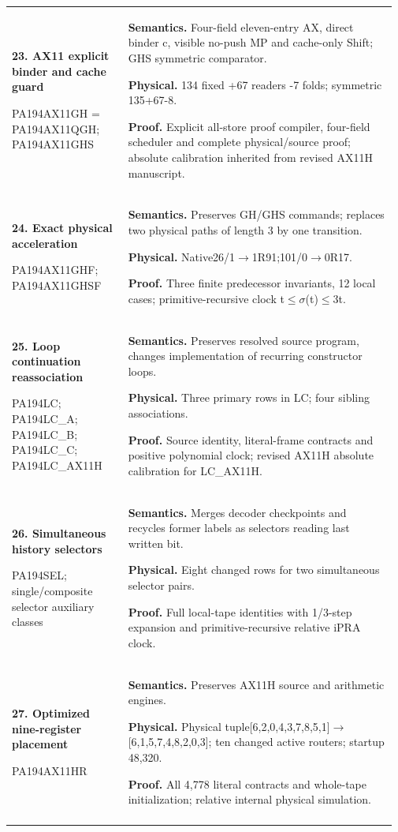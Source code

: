 \begin{longtable}{@{}>{\raggedright\arraybackslash}p{0.295\linewidth}>{\raggedright\arraybackslash}p{0.675\linewidth}@{}}
\textbf{23. AX11 explicit binder and cache guard}\par PA194AX11GH = PA194AX11QGH; PA194AX11GHS & \textbf{Semantics.} Four-field eleven-entry AX, direct binder c, visible no-push MP and cache-only Shift; GHS symmetric comparator.\par\textbf{Physical.} 134 fixed +67 readers -7 folds; symmetric 135+67-8.\par\textbf{Proof.} Explicit all-store proof compiler, four-field scheduler and complete physical/source proof; absolute calibration inherited from revised AX11H manuscript.\\\addlinespace[6pt]
\textbf{24. Exact physical acceleration}\par PA194AX11GHF; PA194AX11GHSF & \textbf{Semantics.} Preserves GH/GHS commands; replaces two physical paths of length 3 by one transition.\par\textbf{Physical.} Native26/1\(\to\)1R91;101/0\(\to\)0R17.\par\textbf{Proof.} Three finite predecessor invariants, 12 local cases; primitive-recursive clock t\(\le\)\(\sigma\)(t)\(\le\)3t.\\\addlinespace[6pt]
\textbf{25. Loop continuation reassociation}\par PA194LC; PA194LC\_\allowbreak{}A; PA194LC\_\allowbreak{}B; PA194LC\_\allowbreak{}C; PA194LC\_\allowbreak{}AX11H & \textbf{Semantics.} Preserves resolved source program, changes implementation of recurring constructor loops.\par\textbf{Physical.} Three primary rows in LC; four sibling associations.\par\textbf{Proof.} Source identity, literal-frame contracts and positive polynomial clock; revised AX11H absolute calibration for LC\_\allowbreak{}AX11H.\\\addlinespace[6pt]
\textbf{26. Simultaneous history selectors}\par PA194SEL; single/composite selector auxiliary classes & \textbf{Semantics.} Merges decoder checkpoints and recycles former labels as selectors reading last written bit.\par\textbf{Physical.} Eight changed rows for two simultaneous selector pairs.\par\textbf{Proof.} Full local-tape identities with 1/3-step expansion and primitive-recursive relative iPRA clock.\\\addlinespace[6pt]
\textbf{27. Optimized nine-register placement}\par PA194AX11HR & \textbf{Semantics.} Preserves AX11H source and arithmetic engines.\par\textbf{Physical.} Physical tuple[6,2,0,4,3,7,8,5,1]\(\to\)[6,1,5,7,4,8,2,0,3]; ten changed active routers; startup 48,320.\par\textbf{Proof.} All 4,778 literal contracts and whole-tape initialization; relative internal physical simulation.\\\addlinespace[6pt]

\end{longtable}
